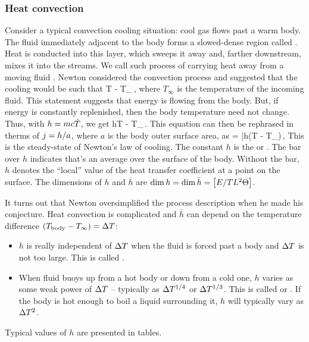 \subsubsection{Heat convection}
Consider a typical convection cooling situation: cool gas flows past a warm body. The fluid immediately adjacent to the body forms a slowed-dense region called . Heat is conducted into this layer, which sweeps it away and, farther downstream, mixes it into the streams. We call such process  of carrying heat away from a moving fluid . Newton considered the convection process and suggested that the cooling would be such that
\beq
{}\propto T - T_\infty\,,
\eeq
where $T_\infty$ is the temperature of the incoming fluid. This statement suggests that energy is flowing from the body. But, if energy is constantly replenished, then the body temperature need not change. Thus, with $h = mc\dot{T}$, we get
\beq
h\propto T - T_\infty\,.
\eeq
This equation can then be rephrased in therms of $j = h/a$, where $a$ is the body outer surface area, as
\beq
\flux = \bar h\left(T - T_\infty\right)\,,
\eeq
This is the steady-state of Newton's law of cooling. The constant $h$ is the  or . The bar over $h$ indicates that's an average over the surface of the body. Without the bar, $h$ denotes the ``local'' value of the heat transfer coefficient at a point on the surface. The dimensions of $h$ and $\bar h$ are $\dim h = \dim\bar h = \left[{E/TL^2\Theta}\right]$.

It turns out that Newton oversimplified the process description when he made his conjecture. Heat convection is complicated and $\bar h$ can depend on the temperature difference $\left(T_\text{body} - T_\infty\right)= \Delta T$:
\begin{itemize}
\item $h$ is really independent of $\Delta T$ when the fluid is forced past a body and $\Delta T$ is not too large. This is called .
%
\item When fluid buoys up from a hot body or down from a cold one, $h$ varies as some weak power of $\Delta T$ -- typically as $\Delta T^{1/4}$ or $\Delta T^{1/3}$. This is called  or . If the body is hot enough to boil a liquid surrounding it, $h$ will typically vary as $\Delta T^{2}$.
\end{itemize}

Typical values of $h$ are presented in tables.

